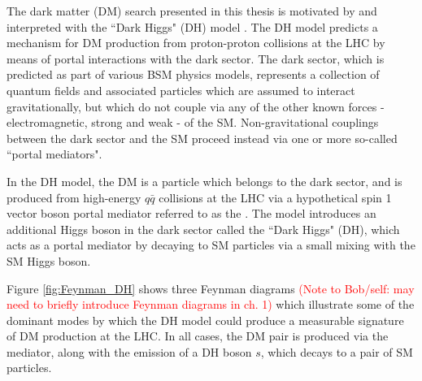 \label{chapter:dh_model}

The dark matter (DM) search presented in this thesis is motivated by and interpreted with the ``Dark Higgs" (DH) model \cite{Duerr2017}. The DH model predicts a mechanism for DM production from proton-proton collisions at the LHC by means of portal interactions with the dark sector. The dark sector, which is predicted as part of various BSM physics models, represents a collection of quantum fields and associated particles which are assumed to interact gravitationally, but which do not couple via any of the other known forces - electromagnetic, strong and weak - of the SM. Non-gravitational couplings between the dark sector and the SM proceed instead via one or more so-called ``portal mediators". 

In the DH model, the DM is a particle which belongs to the dark sector, and is produced from high-energy \(q\bar{q}\) collisions at the LHC via a hypothetical spin 1 vector boson portal mediator referred to as the \Zprime. The model introduces an additional Higgs boson in the dark sector called the ``Dark Higgs" (DH), which acts as a portal mediator by decaying to SM particles via a small mixing with the SM Higgs boson. 

Figure \ref{fig:Feynman_DH} shows three Feynman diagrams \textcolor{red}{(Note to Bob/self: may need to briefly introduce Feynman diagrams in ch. 1)} which illustrate some of the dominant modes by which the DH model could produce a measurable signature of DM production at the LHC. In all cases, the DM pair is produced via the \Zprime mediator, along with the emission of a DH boson \(s\), which decays to a pair of SM particles. 

